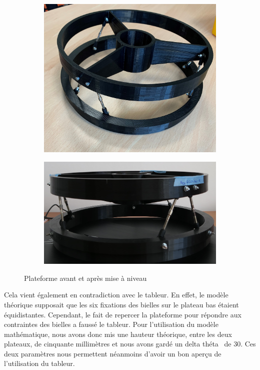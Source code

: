 \documentclass[a4paper,12pt]{article}
\begin{document}
\begin{figure}[H]
    \centering
    \begin{subfigure}[]{0.4\textwidth}
        \includegraphics[width=\textwidth]{plateforme 1.jpg}
    \end{subfigure}
    \begin{subfigure}[]{0.5\textwidth}
        \includegraphics[width=\textwidth]{plateforme a niveau.jpg}
    \end{subfigure}
    \caption{Plateforme avant et après mise à niveau}
\end{figure}


Cela vient également en contradiction avec le tableur. En effet, le modèle théorique supposait que les six fixations des bielles sur le plateau bas étaient équidistantes. 
Cependant, le fait de repercer la plateforme pour répondre aux contraintes des bielles a faussé le tableur. 
Pour l'utilisation du modèle mathématique, nous avons donc mis une hauteur théorique, entre les deux plateaux, de cinquante millimètres et nous avons gardé un \og delta théta \fg \ de 30\degree.
Ces deux paramètres nous permettent néanmoins d'avoir un bon aperçu de l'utilisation du tableur.  
\end{document}
